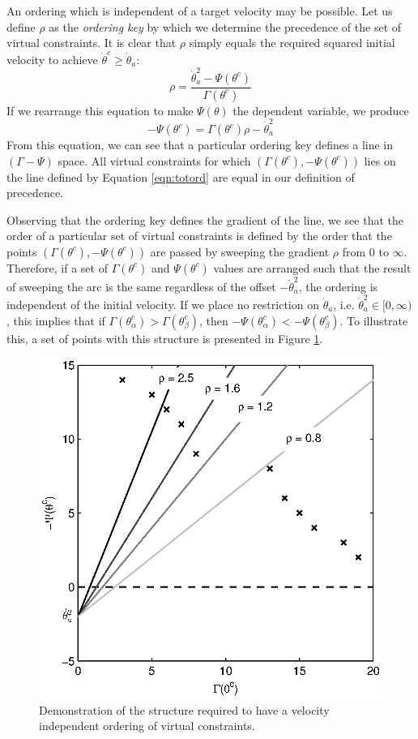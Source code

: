 An ordering which is independent of a target velocity may be possible. Let us define $\rho$ as the \textit{ordering key} by which we determine the precedence of the set of virtual constraints. It is clear that $\rho$ simply equals the required squared initial velocity to achieve $\dot{\theta}^c \geq \dot{\theta}_a$:
\[
	\rho = \frac{\dot{\theta}_a^2 - \Psi(\theta^c)}{\Gamma(\theta^c)}
\]
If we rearrange this equation to make $\Psi(\theta)$ the dependent variable, we produce
\begin{equation} \label{eqn:totord}
	-\Psi(\theta^c) = \Gamma(\theta^c)\rho - \dot{\theta}_a^2
\end{equation}
From this equation, we can see that a particular ordering key defines a line in $(\Gamma-\Psi)$ space. All virtual constraints for which $(\Gamma(\theta^c), -\Psi(\theta^c))$ lies on the line defined by Equation \ref{eqn:totord} are equal in our definition of precedence.

Observing that the ordering key defines the gradient of the line, we see that the order of a particular set of virtual constraints is defined by the order that the points $(\Gamma(\theta^c), -\Psi(\theta^c))$ are passed by sweeping the gradient $\rho$ from 0 to $\infty$. Therefore, if a set of $\Gamma(\theta^c)$ and $\Psi(\theta^c)$ values are arranged such that the result of sweeping the arc is the same regardless of the offset $-\dot{\theta}_a^2$, the ordering is independent of the initial velocity. If we place no restriction on $\dot{\theta}_a$, i.e. $\dot{\theta}_a^2 \in [0, \infty)$, this implies that if $\Gamma(\theta_\alpha^c)>\Gamma(\theta_\beta^c)$, then $-\Psi(\theta_\alpha^c)<-\Psi(\theta_\beta^c)$. To illustrate this, a set of points with this structure is presented in Figure \ref{fig:totord}.

\begin{figure}
\centering
\includegraphics[width=0.8\linewidth]{4VirtConstLib/totord}
\caption[Velocity independent ordering of virtual constraints]{Demonstration of the structure required to have a velocity independent ordering of virtual constraints.}
\label{fig:totord}
\end{figure}


